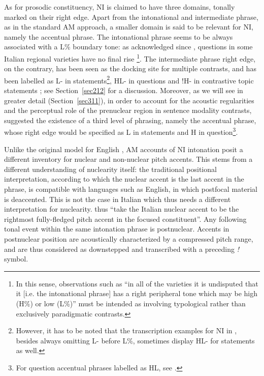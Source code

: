 As for prosodic constituency, NI is claimed to have three domains, tonally marked on their right edge. Apart from the intonational and intermediate phrase, as in the standard AM approach, a smaller domain is said to be relevant for NI, namely the accentual phrase. The intonational phrase seems to be always associated with a L\% boundary tone: as acknowledged since \citet{grice1991intonation}, questions in some Italian regional varieties have no final rise \citep{savino2012intonation}\footnote{In this sense, observations such as ``in all of the varieties it is undisputed that it [i.e. the intonational phrase] has a right peripheral tone which may be high (H\%) or low (L\%)'' \cite[373]{grice2005strategy} must be intended as involving typological rather than exclusively paradigmatic contrasts.}. The intermediate phrase right edge, on the contrary, has been seen as the docking site for multiple contrasts, and has been labelled as L- in statements\footnote{However, it has to be noted that the transcription examples for NI in \citet{grice2005strategy}, besides always omitting L- before L\%, sometimes display HL- for statements as well.}, HL- in questions \citep{dimperio2001focus} and !H- in contrastive topic statements \citep{dimperio2011phrasing}; see Section~\ref{sec212} for a discussion. Moreover, as we will see in greater detail (Section~\ref{sec311}), in order to account for the acoustic regularities and the perceptual role of the prenuclear region in sentence modality contrasts, \citet{petrone2011tones} suggested the existence of a third level of phrasing, namely the accentual phrase, whose right edge would be specified as L in statements and H in question\footnote{For question accentual phrases labelled as HL, see \citet{petrone2008tonal}.}.

Unlike the original model for English \citep{pierrehumbert1980phonology}, AM accounts of NI intonation posit a different inventory for nuclear and non-nuclear pitch accents. This stems from a different understanding of nuclearity itself: the traditional positional interpretation, according to which the nuclear accent is the last accent in the phrase, is compatible with languages such as English, in which postfocal material is deaccented. This is not the case in Italian \citep{swerts1999reaccentuation} which thus needs a different interpretation for nuclearity. \citet[380]{grice2005strategy} thus ``take the Italian nuclear accent to be the rightmost fully-fledged pitch accent in the focused constituent''. Any following tonal event within the same intonation phrase is postnuclear. Accents in postnuclear position are acoustically characterized by a compressed pitch range, and are thus considered as downstepped and transcribed with a preceding \textit{!} symbol.

